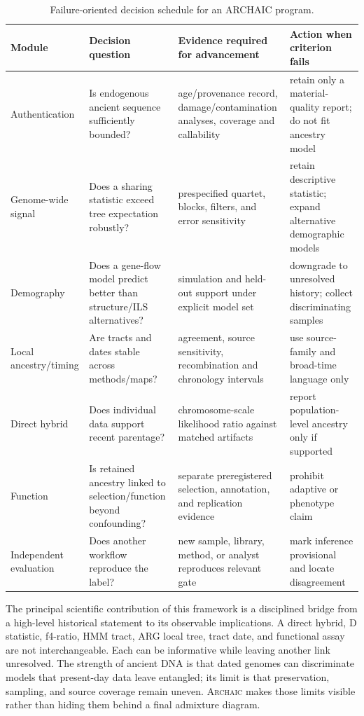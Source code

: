 \documentclass[conference]{IEEEtran}
\newcommand{\archaic}{\textsc{Archaic}}
\begin{document}
\begin{table}[t]
\caption{Failure-oriented decision schedule for an ARCHAIC program.}
\label{tab:schedule}
\centering
\footnotesize
\begin{tabular}{L{0.18\textwidth} L{0.24\textwidth} L{0.27\textwidth} L{0.21\textwidth}}
\toprule
Module & Decision question & Evidence required for advancement & Action when criterion fails \\
\midrule
Authentication & Is endogenous ancient sequence sufficiently bounded? & age/provenance record, damage/contamination analyses, coverage and callability & retain only a material-quality report; do not fit ancestry model \\
Genome-wide signal & Does a sharing statistic exceed tree expectation robustly? & prespecified quartet, blocks, filters, and error sensitivity & retain descriptive statistic; expand alternative demographic models \\
Demography & Does a gene-flow model predict better than structure/ILS alternatives? & simulation and held-out support under explicit model set & downgrade to unresolved history; collect discriminating samples \\
Local ancestry/timing & Are tracts and dates stable across methods/maps? & agreement, source sensitivity, recombination and chronology intervals & use source-family and broad-time language only \\
Direct hybrid & Does individual data support recent parentage? & chromosome-scale likelihood ratio against matched artifacts & report population-level ancestry only if supported \\
Function & Is retained ancestry linked to selection/function beyond confounding? & separate preregistered selection, annotation, and replication evidence & prohibit adaptive or phenotype claim \\
Independent evaluation & Does another workflow reproduce the label? & new sample, library, method, or analyst reproduces relevant gate & mark inference provisional and locate disagreement \\
\bottomrule
\end{tabular}
\end{table}

The principal scientific contribution of this framework is a disciplined bridge from a high-level historical statement to its observable implications. A direct hybrid, D statistic, f4-ratio, HMM tract, ARG local tree, tract date, and functional assay are not interchangeable. Each can be informative while leaving another link unresolved. The strength of ancient DNA is that dated genomes can discriminate models that present-day data leave entangled; its limit is that preservation, sampling, and source coverage remain uneven. \archaic{} makes those limits visible rather than hiding them behind a final admixture diagram.
\end{document}
